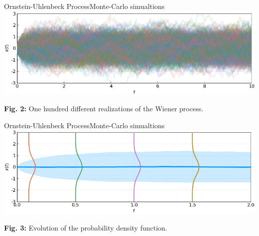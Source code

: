 \documentclass[usenames,dvipsnames,svgnames,10pt,aspectratio=169]{beamer}
\begin{document}
\begin{frame}[t, c]{Ornstein-Uhlenbeck Process}{Monte-Carlo simualtions}
	\centering
	\includegraphics[width=.8\textwidth]{orstein_uhlenbeck_process_monte_carlo}

	\textbf{Fig. 2:} One hundred different realizations of the Wiener process.

	\vspace{1cm}
\end{frame}

\begin{frame}[t, c]{Ornstein-Uhlenbeck Process}{Monte-Carlo simualtions}
	\centering
	\includegraphics[width=.8\textwidth]{orstein_uhlenbeck_process_monte_carlo_summary}

	\textbf{Fig. 3:} Evolution of the probability density function.

	\vspace{1cm}
\end{frame}
\end{document}
